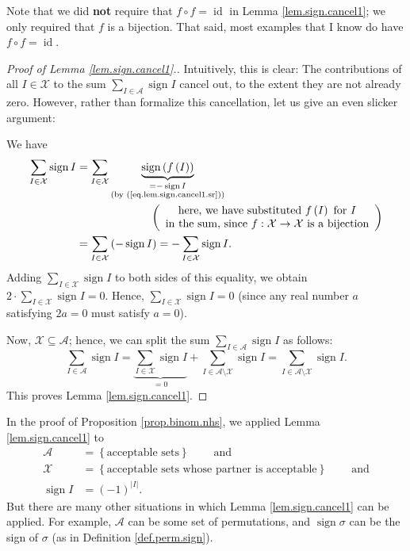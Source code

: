 Note that we did \textbf{not} require that $f\circ f=\operatorname*{id}$ in
Lemma \ref{lem.sign.cancel1}; we only required that $f$ is a bijection. That
said, most examples that I know do have $f\circ f=\operatorname*{id}$.

\begin{proof}
[Proof of Lemma \ref{lem.sign.cancel1}.]Intuitively, this is clear: The
contributions of all $I\in\mathcal{X}$ to the sum $\sum_{I\in\mathcal{A}%
}\operatorname*{sign}I$ cancel out, to the extent they are not already zero.
However, rather than formalize this cancellation, let us give an even slicker argument:

We have%
\begin{align*}
\sum_{I\in\mathcal{X}}\operatorname*{sign}I  &  =\sum_{I\in\mathcal{X}%
}\underbrace{\operatorname*{sign}\left(  f\left(  I\right)  \right)
}_{\substack{=-\operatorname*{sign}I\\\text{(by (\ref{eq.lem.sign.cancel1.sr}%
))}}}\\
&  \ \ \ \ \ \ \ \ \ \ \ \ \ \ \ \ \ \ \ \ \left(
\begin{array}
[c]{c}%
\text{here, we have substituted }f\left(  I\right)  \text{ for }I\\
\text{in the sum, since }f:\mathcal{X}\rightarrow\mathcal{X}\text{ is a
bijection}%
\end{array}
\right) \\
&  =\sum_{I\in\mathcal{X}}\left(  -\operatorname*{sign}I\right)  =-\sum
_{I\in\mathcal{X}}\operatorname*{sign}I.
\end{align*}
Adding $\sum_{I\in\mathcal{X}}\operatorname*{sign}I$ to both sides of this
equality, we obtain $2\cdot\sum_{I\in\mathcal{X}}\operatorname*{sign}I=0$.
Hence, $\sum_{I\in\mathcal{X}}\operatorname*{sign}I=0$ (since any real number
$a$ satisfying $2a=0$ must satisfy $a=0$).

Now, $\mathcal{X}\subseteq\mathcal{A}$; hence, we can split the sum
$\sum_{I\in\mathcal{A}}\operatorname*{sign}I$ as follows:%
\[
\sum_{I\in\mathcal{A}}\operatorname*{sign}I=\underbrace{\sum_{I\in\mathcal{X}%
}\operatorname*{sign}I}_{=0}+\sum_{I\in\mathcal{A}\setminus\mathcal{X}%
}\operatorname*{sign}I=\sum_{I\in\mathcal{A}\setminus\mathcal{X}%
}\operatorname*{sign}I.
\]
This proves Lemma \ref{lem.sign.cancel1}.
\end{proof}

In the proof of Proposition \ref{prop.binom.nhs}, we applied Lemma
\ref{lem.sign.cancel1} to%
\begin{align*}
\mathcal{A}  &  =\left\{  \text{acceptable sets}\right\}
\ \ \ \ \ \ \ \ \ \ \text{and}\\
\mathcal{X}  &  =\left\{  \text{acceptable sets whose partner is
acceptable}\right\}  \ \ \ \ \ \ \ \ \ \ \text{and}\\
\operatorname*{sign}I  &  =\left(  -1\right)  ^{\left\vert I\right\vert }.
\end{align*}
But there are many other situations in which Lemma \ref{lem.sign.cancel1} can
be applied. For example, $\mathcal{A}$ can be some set of permutations, and
$\operatorname*{sign}\sigma$ can be the sign of $\sigma$ (as in Definition
\ref{def.perm.sign}).

